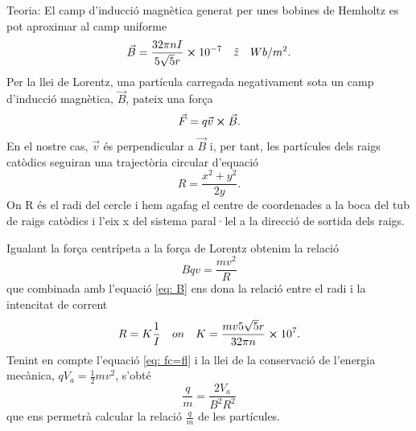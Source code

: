 \documentclass[11pt]{article}
\begin{document}
Teoria: 
El camp d'inducció magnètica generat per unes bobines de Hemholtz es pot aproximar al camp uniforme 
\begin{equation}
    \vec{B}=\frac{32\pi nI}{5\sqrt{5}r}\cross10^{-7} \quad \hat{z}\quad Wb/m^2.
    \label{eq: B}
\end{equation}
Per la llei de Lorentz, una partícula carregada negativament sota un camp d'inducció magnètica, $\vec{B}$, pateix una força
\begin{equation}
    \vec{F}=q\vec{v}\cross\vec{B}.
    \label{eq: Lorentz} 
\end{equation} 
En el nostre cas, $\vec{v}$ és perpendicular a $\vec{B }$ i, per tant, les partícules dels raigs catòdics seguiran una trajectòria circular d'equació
\begin{equation}
    R=\frac{x^2+y^2}{2y}.
    \label{eq: radi}
\end{equation}
On R és el radi del cercle i hem agafag el centre de coordenades a la boca del tub de raigs catòdics i l'eix x del sistema paral·lel a la direcció de sortida dels raigs.

Igualant la força centrípeta a la força de Lorentz obtenim la relació 
\begin{equation}
    Bqv=\frac{mv^2}{R}
    \label{eq: fc=fl}
\end{equation}
que combinada amb l'equació \ref{eq: B} ens dona la relació entre el radi i la intencitat de corrent
\begin{equation}
    R=K\frac{1}{I} \quad on \quad K=\frac{mv5\sqrt{5}r}{32\pi n}\cross 10^7.
    \label{eq: IvsR}
\end{equation}
Tenint en compte l'equació \ref{eq: fc=fl} i la llei de la conservació de l'energia mecànica, $qV_a = \frac{1}{2}mv^2$, s'obté 
\begin{equation}
    \frac{q}{m}=\frac{2V_a }{B^2R^2}
    \label{eq: q/m}
\end{equation}
que ens permetrà calcular la relació $\frac{q}{m}$ de les partícules.
\end{document}
